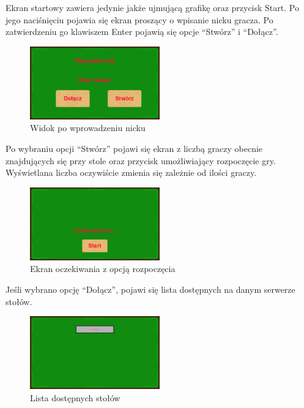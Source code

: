\documentclass{article}
\begin{document}
Ekran startowy zawiera jedynie jakże ujmującą grafikę oraz przycisk Start. Po jego naciśnięciu pojawia się ekran proszący o wpisanie nicku gracza. Po zatwierdzeniu go klawiszem Enter pojawią się opcje ``Stwórz'' i ``Dołącz''.

\begin{figure}[H]
\centering
\includegraphics[width=0.5\textwidth]{wprowadzanie}
\caption{Widok po wprowadzeniu nicku}
\end{figure}

Po wybraniu opcji ``Stwórz'' pojawi się ekran z liczbą graczy obecnie znajdujących się przy stole oraz przycisk umożliwiający rozpoczęcie gry. Wyświetlana liczba oczywiście zmienia się zależnie od ilości graczy.

\begin{figure}[H]
\centering
\includegraphics[width=0.5\textwidth]{oczekiwanie}
\caption{Ekran oczekiwania z opcją rozpoczęcia}
\end{figure}

Jeśli wybrano opcję ``Dołącz'', pojawi się lista dostępnych na danym serwerze stołów.

\begin{figure}[H]
\centering
\includegraphics[width=0.5\textwidth]{dostepnestoly}
\caption{Lista dostępnych stołów}
\end{figure}
\end{document}
